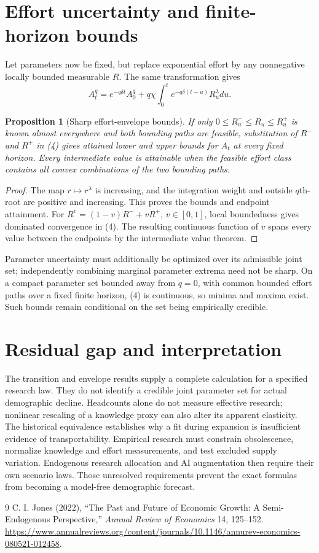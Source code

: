 \documentclass[11pt]{article}
\newtheorem{proposition}[theorem]{Proposition}
\theoremstyle{definition}
\begin{document}
\section*{Effort uncertainty and finite-horizon bounds}
Let parameters now be fixed, but replace exponential effort by any nonnegative locally bounded measurable $R$. The same transformation gives
\[
 A_t^q=e^{-q\delta t}A_0^q+
 q\chi\int_0^t e^{-q\delta(t-u)}R_u^\lambda du.
 \tag{4}
\]
\begin{proposition}[Sharp effort-envelope bounds]
If only $0\le R_u^-\le R_u\le R_u^+$ is known almost everywhere and both bounding paths are feasible, substitution of $R^-$ and $R^+$ in (4) gives attained lower and upper bounds for $A_t$ at every fixed horizon. Every intermediate value is attainable when the feasible effort class contains all convex combinations of the two bounding paths.
\end{proposition}
\begin{proof}
The map $r\mapsto r^\lambda$ is increasing, and the integration weight and outside $q$th-root are positive and increasing. This proves the bounds and endpoint attainment. For $R^v=(1-v)R^-+vR^+$, $v\in[0,1]$, local boundedness gives dominated convergence in (4). The resulting continuous function of $v$ spans every value between the endpoints by the intermediate value theorem.
\end{proof}
Parameter uncertainty must additionally be optimized over its admissible joint set; independently combining marginal parameter extrema need not be sharp. On a compact parameter set bounded away from $q=0$, with common bounded effort paths over a fixed finite horizon, (4) is continuous, so minima and maxima exist. Such bounds remain conditional on the set being empirically credible.

\section*{Residual gap and interpretation}
The transition and envelope results supply a complete calculation for a specified research law. They do not identify a credible joint parameter set for actual demographic decline. Headcounts alone do not measure effective research; nonlinear rescaling of a knowledge proxy can also alter its apparent elasticity. The historical equivalence establishes why a fit during expansion is insufficient evidence of transportability. Empirical research must constrain obsolescence, normalize knowledge and effort measurements, and test excluded supply variation. Endogenous research allocation and AI augmentation then require their own scenario laws. Those unresolved requirements prevent the exact formulas from becoming a model-free demographic forecast.

\begin{thebibliography}{9}
 C. I. Jones (2022), ``The Past and Future of Economic Growth: A Semi-Endogenous Perspective,'' \emph{Annual Review of Economics} 14, 125--152. \url{https://www.annualreviews.org/content/journals/10.1146/annurev-economics-080521-012458}.
\end{thebibliography}
\end{document}
